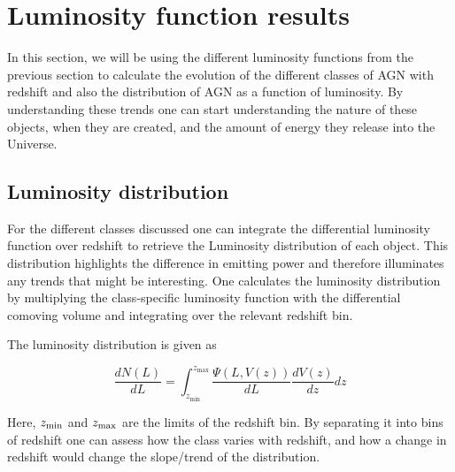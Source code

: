 \section{Luminosity function results}
In this section, we will be using the different luminosity functions from the previous section to calculate the evolution of the different classes of AGN with redshift and also the distribution of AGN as a function of luminosity. 
By understanding these trends one can start understanding the nature of these objects, when they are created, and the amount of energy they release into the Universe. 



 


\subsection{Luminosity distribution}
 
For the different classes discussed one can integrate the differential luminosity function over redshift to retrieve the Luminosity distribution of each 
object. This distribution highlights the difference in emitting power and therefore illuminates any trends that might be interesting. 
One calculates the luminosity distribution by multiplying the class-specific luminosity
function with the differential comoving volume and integrating over the relevant redshift bin. 

The luminosity distribution is given as


\begin{equation}
    \frac{dN(L)}{dL} = \int_{z_{\text{min}}}^{z_{\text{max}}} \frac{\Psi(L, V(z))}{dL} \frac{dV(z)}{dz} dz
\end{equation}

Here, $z_{\rm min}$ and $z_{\rm max}$ are the limits of the redshift bin. By separating it into
bins of redshift one can assess how the class varies with redshift, and how a change in redshift would change the slope/trend of the distribution.  

